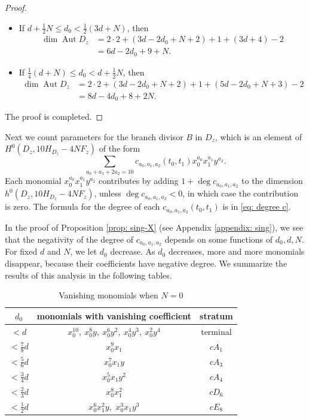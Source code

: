 \documentclass[a4paper,11pt]{amsart}
\DeclareMathOperator{\Aut}{Aut}
\theoremstyle{definition}
\theoremstyle{remark}
\numberwithin{equation}{section}
\begin{document}
\begin{proof}
\begin{itemize}
		\item [(2)] If $d + \frac{1}{2}N \le d_0 < \frac12(3d + N)$, then
		\begin{align*}
			\dim\Aut D_z & = 2 \cdot 2 + (3d - 2d_0 + N + 2) + 1 + (3d+4) - 2 \\
			& = 6d - 2d_0 + 9 + N.
		\end{align*}
			
		\item [(3)] If $\frac14(d + N) \le d_0 < d + \frac{1}{2}N$, then
		\begin{align*}
			\dim\Aut D_z & = 2 \cdot 2 + (3d - 2d_0 + N + 2) + 1 + (5d - 2d_0 + N + 3) - 2 \\
			& = 8d - 4d_0 + 8 + 2N.
		\end{align*}
	\end{itemize}
	The proof is completed.
\end{proof}
	
Next we count parameters for the branch divisor $B$ in $D_z$, which is an element of $H^0(D_z, 10H_{D_z} - 4NF_z)$ of the form
$$
\sum_{a_0+a_1+2a_2 = 10}
c_{a_0,a_1,a_2}(t_0,t_1) x_0^{a_0} x_1^{a_1} y^{a_2}.
$$
Each monomial $x_0^{a_0} x_1^{a_1} y^{a_2}$ contributes by adding $1 + \deg c_{a_0,a_1,a_2}$ to the dimension $h^0(D_z, 10H_{D_z} - 4NF_z)$, unless $\deg c_{a_0,a_1,a_2} < 0$, in which case the contribution is zero. The formula for the degree of each $c_{a_0,a_1,a_2}(t_0,t_1)$ is in \eqref{eq: degree c}.

In the proof of Proposition \ref{prop: sing-X} (see Appendix \ref{appendix: sing}), we see that the negativity of the degree of $c_{a_0,a_1,a_2}$ depends on some functions of $d_0,d,N$. For fixed $d$ and $N$, we let $d_0$ decrease. As $d_0$ decreases, more and more monomials disappear, because their coefficients have negative degree.
We summarize the results of this analysis in the following tables. 
\begin{table}[ht]\caption{Vanishing monomials when $N = 0$} \label{tab: N=0}
	\begin{tabular}{ccc}
        \hline
		$d_0$ & monomials with vanishing coefficient & stratum\\
		\hline
		$<d$ & $x_0^{10},\ x_0^8y,\ x_0^6y^2,\ x_0^4y^3,\ x_0^2y^4$& terminal  \\
		$<\frac78d$ & $x_0^9x_1$ &$cA_1$\\
		$<\frac56d$ & $x_0^7x_1y$ &$cA_3$\\
		$<\frac34d$& $x_0^5x_1y^2$ &$cA_4$ \\
		$<\frac23d$ & $x_0^8x_1^2$ &$cD_6$\\
		$<\frac12d$& $x_0^6x_1^2y$,\ $x_0^3x_1y^3$ &$cE_8$ \\
	\end{tabular}
\end{table}
\end{document}
